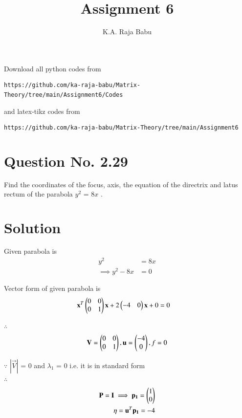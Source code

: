 \documentclass[journal,12pt,twocolumn]{IEEEtran}
\begin{document}
     \def\rightbox#1{\makebox[0in][r]{#1}}
     \def\centbox#1{\makebox[0in]{#1}}
     \def\topbox#1{\raisebox{-\baselineskip}[0in][0in]{#1}}
     \def\midbox#1{\raisebox{-0.5\baselineskip}[0in][0in]{#1}}
\vspace{3cm}
\title{Assignment 6}
\author{K.A. Raja Babu}
\maketitle
\newpage
\bigskip
\renewcommand{\thefigure}{\theenumi}
\renewcommand{\thetable}{\theenumi}
Download all python codes from 
\begin{lstlisting}
https://github.com/ka-raja-babu/Matrix-Theory/tree/main/Assignment6/Codes
\end{lstlisting}
%
and latex-tikz codes from 
%
\begin{lstlisting}
https://github.com/ka-raja-babu/Matrix-Theory/tree/main/Assignment6
\end{lstlisting}
%
\section{Question No. 2.29}
Find the coordinates of the focus, axis, the equation of the directrix and latus rectum of the parabola $y^2$ = 8$x$ .
%
\section{Solution}
Given parabola is 
\begin{align}
y^2 &= 8x
\\
\implies y^2 - 8x &= 0
\end{align}

Vector form of given parabola is
\begin{align}
\mathbf{x}^T\begin{pmatrix}0 & 0 \\ 0 & 1\end{pmatrix}\mathbf{x} + 2\begin{pmatrix}-4 & 0\end{pmatrix}\mathbf{x} + 0 &= 0 
\end{align}

$\therefore$
\begin{align}
 \mathbf{V} = \begin{pmatrix}0 & 0 \\ 0 & 1\end{pmatrix} ,
 \mathbf{u} = \begin{pmatrix}-4\\0\end{pmatrix} ,
 f = 0
\end{align}

$\because$
$|\vec{V}|$ = 0 and $\lambda_1$ = 0 i.e. it is in standard form
\\
$\therefore$
\begin{align}
\mathbf{P}=\mathbf{I} \implies \mathbf{p_1} = \begin{pmatrix}1\\0\end{pmatrix}
\\
\eta = \mathbf{u}^T\mathbf{p_1} = -4
\end{align}
\end{document}
